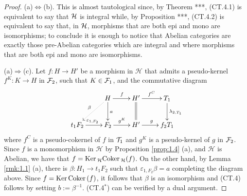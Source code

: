 \begin{proof}
(a)$\Leftrightarrow$(b). This is almost tautological since, by Theorem ***, (CT.4.1) is equivalent to say that $\mathcal H$ is integral while, by Proposition ***, (CT.4.2) is equivalent to say that, in $\mathcal H$, morphisms that are both epi and mono are isomorphisms; to conclude it is enough to notice that Abelian categories are exactly those pre-Abelian categories which are integral and where morphisms that are both epi and mono are isomorphisms.


\smallskip\noindent
(a)$\Rightarrow$(c). 
Let $f\colon H\to H'$ be a morphism in $\mathcal{H}$ that admits a pseudo-kernel $f^K\colon K\to H$ in $\mathcal F_2$, such that $K\in \mathcal F_1$, and the commutative diagram
\begin{equation*}
\xymatrix{
 & H\ar@{.>}[dl]_{\beta}\ar[d]^{a}\ar[r]^{f} & H'\ar@{=}[d]\ar[r]^{f^C} & T_1\ar[d]^{\lambda_{2,T_1}}\\
t_1F_2\ar[r]^{\varepsilon_{1,F_2}} & F_2\ar[r]^{g^K} & H'\ar[r]^{g} & f_2T_1
}
\end{equation*}
where $f^C$  is a pseudo-cokernel of $f$ in $\mathcal T_1$ and $g^K$ is a pseudo-kernel of $g$ in $\mathcal F_2$. Since $f$ is a monomorphism in $\mathcal{H}$ by Proposition \ref{prop:1.4} (a), and $\mathcal{H}$ is Abelian, we have that $f=\mathrm{\textup{Ker\,}}_\mathcal H \mathrm{\textup{Coker\,}}_\mathcal H (f)$. On the other hand, by Lemma \ref{rmk:1.1} (a), there is $\beta\colon H_1\to t_1F_2$ such that $\varepsilon_{1,F_2}\beta = a$ completing the diagram above. Since $f=\mathrm{\textup{Ker\,}} \mathrm{\textup{Coker\,}}(f)$, it follows that $\beta$ is an isomorphism and (CT.4) follows by setting $b:=\beta^{-1}$. (CT.4$^*$) can be verified by a dual argument.




\end{proof}
